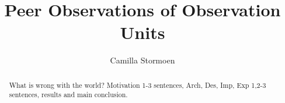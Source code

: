 \documentclass[USenglish]{uit-thesis}
\begin{document}

\title{Peer Observations of Observation Units}
\author{Camilla Stormoen}

\maketitle

\frontmatter





\begin{abstract}
What is wrong with the world? Motivation 1-3 sentences, Arch, Des, Imp, Exp 1,2-3 sentences, results and main conclusion.
\end{abstract}

\begin{acknowledgement}


\end{acknowledgement}

\tableofcontents


\end{document}
